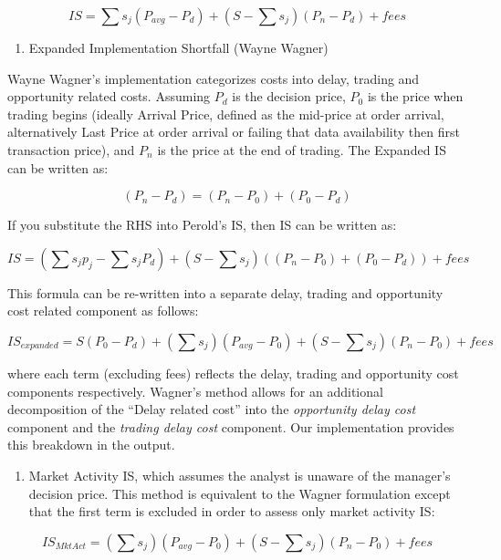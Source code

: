 \[ IS = \sum s_{j} (P_{avg} - P_{d}) + (S - \sum s_{j}) (P_{n} - P_{d}) + fees \]

\begin{enumerate}
\def\labelenumi{\arabic{enumi}.}
\setcounter{enumi}{2}
\tightlist
\item
  Expanded Implementation Shortfall (Wayne Wagner)
\end{enumerate}

Wayne Wagner's implementation categorizes costs into delay, trading and
opportunity related costs. Assuming \(P_{d}\) is the decision price,
\(P_{0}\) is the price when trading begins (ideally Arrival Price,
defined as the mid-price at order arrival, alternatively Last Price at
order arrival or failing that data availability then first transaction
price), and \(P_{n}\) is the price at the end of trading. The Expanded
IS can be written as:

\[ (P_{n} - P_{d}) = (P_{n} - P_{0}) + (P_{0} - P_{d}) \]

If you substitute the RHS into Perold's IS, then IS can be written as:

\[ IS = (\sum s_{j}p_{j} - \sum s_{j}P_{d}) + (S - \sum s_{j}) ((P_{n} - P_{0}) + (P_{0} - P_{d})) + fees \]

This formula can be re-written into a separate delay, trading and
opportunity cost related component as follows:

\[ IS_{expanded} = S(P_{0} - P_{d}) + (\sum s_{j})(P_{avg} - P_{0}) + (S - \sum s_{j})(P_{n} - P_{0}) + fees \]

where each term (excluding fees) reflects the delay, trading and
opportunity cost components respectively. Wagner's method allows for an
additional decomposition of the ``Delay related cost'' into the
\emph{opportunity delay cost} component and the
\emph{trading delay cost} component. Our implementation provides this
breakdown in the output.

\begin{enumerate}
\def\labelenumi{\arabic{enumi}.}
\setcounter{enumi}{3}
\tightlist
\item
  Market Activity IS, which assumes the analyst is unaware of the
  manager's decision price. This method is equivalent to the Wagner
  formulation except that the first term is excluded in order to assess
  only market activity IS:
\end{enumerate}

\[ IS_{MktAct} = (\sum s_{j})(P_{avg} - P_{0}) + (S - \sum s_{j})(P_{n} - P_{0}) + fees \]

